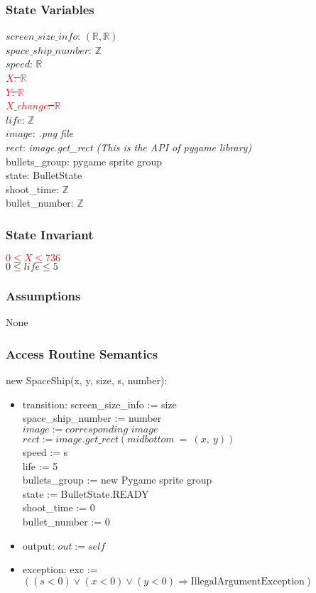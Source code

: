\documentclass[12pt]{article}
\begin{document}
\subsubsection*{State Variables}
$\mathit{screen\_size\_info}$: $(\mathbb{R}, \mathbb{R})$\\
$\mathit{space\_ship\_number}$: $\mathbb{Z}$\\
$\mathit{speed}$: $\mathbb{R}$\\
\textcolor{red}{\st{$\mathit{X}$: $\mathbb{R}$}}\\
\textcolor{red}{\st{$\mathit{Y}$: $\mathbb{R}$}}\\
\textcolor{red}{\st{$\mathit{X\_change}$: $\mathbb{R}$}}\\
$\mathit{life}$: $\mathbb{Z}$\\
$\mathit{image}$: \textit{.png file}\\
$\mathit{rect}$: \textit{image.get\_rect (This is the API of pygame library)}\\
bullets\_group: pygame sprite group\\
state: BulletState\\
shoot\_time: $\mathbb{Z}$\\
bullet\_number: $\mathbb{Z}$
\subsubsection*{State Invariant}
\textcolor{red}{\st{$0 \leq X \leq 736$}}\\
$0 \leq life \leq 5$
\subsubsection*{Assumptions}
None
\subsubsection*{Access Routine Semantics}
\noindent new SpaceShip(x, y, size, s, number):
\begin{itemize}
\item transition:
screen\_size\_info := size\\
space\_ship\_number := number\\
$image := \textit{corresponding image}$\\
  $rect := image.get\_rect(midbottom\ =\ (x,\ y))$\\
  speed := s\\
  life := 5\\
  bullets\_group := new Pygame sprite group\\
  state := BulletState.READY\\
  shoot\_time := 0\\
  bullet\_number := 0
\item output: $out := \mathit{self}$
\item exception: exc := $((\mathit{s} < 0) \vee (\mathit{x} < 0) \vee 
  (\mathit{y} < 0) \Rightarrow \text{IllegalArgumentException})$
\end{itemize}
\end{document}
